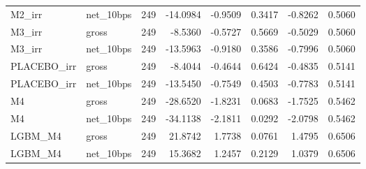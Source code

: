 \begin{tabular}{llrrrrrr}
M2\_irr & net\_10bps & 249 & -14.0984 & -0.9509 & 0.3417 & -0.8262 & 0.5060 \\
M3\_irr & gross & 249 & -8.5360 & -0.5727 & 0.5669 & -0.5029 & 0.5060 \\
M3\_irr & net\_10bps & 249 & -13.5963 & -0.9180 & 0.3586 & -0.7996 & 0.5060 \\
PLACEBO\_irr & gross & 249 & -8.4044 & -0.4644 & 0.6424 & -0.4835 & 0.5141 \\
PLACEBO\_irr & net\_10bps & 249 & -13.5450 & -0.7549 & 0.4503 & -0.7783 & 0.5141 \\
M4 & gross & 249 & -28.6520 & -1.8231 & 0.0683 & -1.7525 & 0.5462 \\
M4 & net\_10bps & 249 & -34.1138 & -2.1811 & 0.0292 & -2.0798 & 0.5462 \\
LGBM\_M4 & gross & 249 & 21.8742 & 1.7738 & 0.0761 & 1.4795 & 0.6506 \\
LGBM\_M4 & net\_10bps & 249 & 15.3682 & 1.2457 & 0.2129 & 1.0379 & 0.6506 \\
\bottomrule
\end{tabular}
